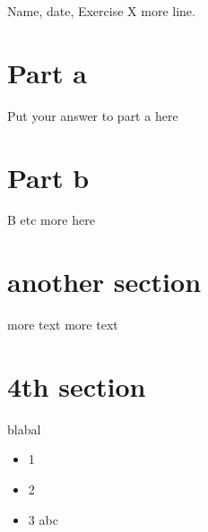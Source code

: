 \documentclass{article}
\begin{document}
Name, date, Exercise X
 more line.
\section*{Part a}

Put your answer to part a here

\section*{Part b}
B
etc
more here
\section*{another section}
\newpage
\newpage
more text
more text
\newpage
\section*{4th section}
blabal
\begin{itemize}
    \item 1 
    \item 2
    \item 3 abc
\end{itemize}
\end{document}

